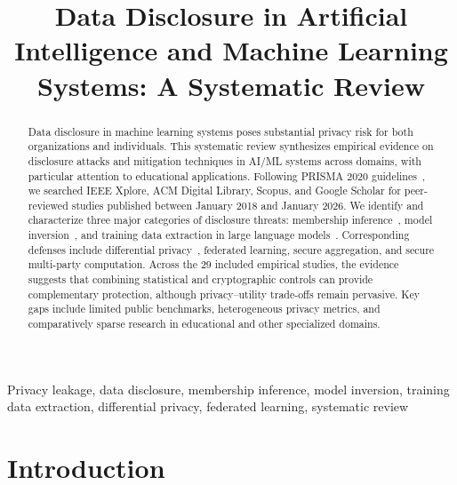 \documentclass[conference]{IEEEtran}
\begin{document}
\title{Data Disclosure in Artificial Intelligence and Machine Learning Systems: A Systematic Review}

\author{
}

\maketitle

\begin{abstract}
Data disclosure in machine learning systems poses substantial privacy risk for both organizations and individuals. This systematic review synthesizes empirical evidence on disclosure attacks and mitigation techniques in AI/ML systems across domains, with particular attention to educational applications. Following PRISMA 2020 guidelines~\cite{prisma2020}, we searched IEEE Xplore, ACM Digital Library, Scopus, and Google Scholar for peer-reviewed studies published between January 2018 and January 2026. We identify and characterize three major categories of disclosure threats: membership inference~\cite{shokri2017membership}, model inversion~\cite{fredrikson2015model}, and training data extraction in large language models~\cite{carlini2021extracting}. Corresponding defenses include differential privacy~\cite{abadi2016deep}, federated learning, secure aggregation, and secure multi-party computation. Across the 29 included empirical studies, the evidence suggests that combining statistical and cryptographic controls can provide complementary protection, although privacy--utility trade-offs remain pervasive. Key gaps include limited public benchmarks, heterogeneous privacy metrics, and comparatively sparse research in educational and other specialized domains.
\end{abstract}

\begin{IEEEkeywords}
Privacy leakage, data disclosure, membership inference, model inversion, training data extraction, differential privacy, federated learning, systematic review
\end{IEEEkeywords}

\section{Introduction}
\end{document}
